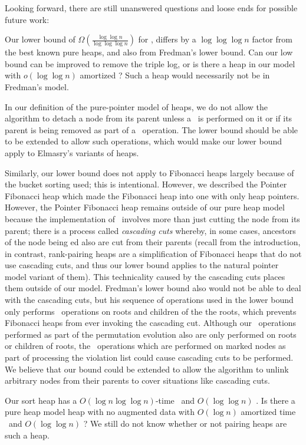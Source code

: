 \begin{fullonly}
Looking forward, there are still unanswered questions and loose ends for possible future work:


\shortfull{}{\item} Our lower bound of $\Omega \left( \frac{\log \log n}{\log \log \log n} \right)$ for \opDc, differs by a $\log \log \log n$ factor from the best known pure heaps, and also from Fredman's lower bound. Can our low bound can be improved to remove the triple log, or is there a heap in our model with $o(\log \log n)$ amortized \opDc? Such a heap would necessarily not be in Fredman's model.

\shortfull{}{\item} In our definition of the pure-pointer model of heaps, we do not allow the algorithm to detach a node from its parent unless a \opDc\ is performed on it or if its parent is being removed as part of a \opEm\ operation. The lower bound should be able to be extended to allow such operations, which would make our lower bound apply to Elmasry's variants of heaps.


Similarly, our lower bound does not apply to Fibonacci heaps largely because of the bucket sorting used; this is intentional. However, we described the Pointer Fibonacci heap which made the Fibonacci heap into one with only heap pointers.
However, the Pointer Fibonacci heap remains outside of our pure heap model because the implementation of \opDc\ involves more than just cutting the node from its parent; there is a process called \emph{cascading cuts} whereby, in some cases, ancestors of the node being \opDc ed also are cut from their parents (recall from the introduction, in contrast, rank-pairing heaps are a simplification of Fibonacci heaps that do not use cascading cuts, and thus our lower bound applies to the natural pointer model variant of them). This technicality caused by the cascading cuts places them outside of our model. Fredman's lower bound also would not be able to deal with the cascading cuts, but his sequence of operations used in the lower bound only performs \opDc\ operations on roots and children of the the roots, which prevents Fibonacci heaps from ever invoking the cascading cut. Although our \opDc\ operations performed as part of the permutation evolution also are only performed on roots or children of roots, the \opDc\ operations which are performed on marked nodes as part of processing the violation list could cause cascading cuts to be performed.
We believe that our bound could be extended to allow the algorithm to unlink arbitrary nodes from their parents to cover situations like cascading cuts. 

\shortfull{}{\item} Our sort heap has a $O(\log n \log \log n)$-time \opEm\ and $O(\log \log n)$ \opDc. Is there a pure heap model heap with no augmented data with $O(\log  n)$ amortized time \opEm\ and $O(\log \log n)$ \opDc? We still do not know whether or not pairing heaps are such a heap.
\end{fullonly}


